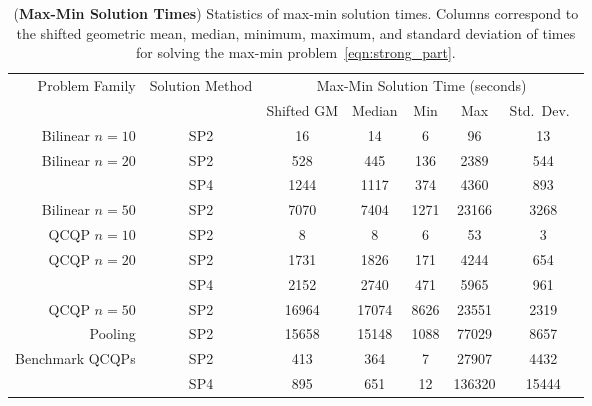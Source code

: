 \documentclass{article}
\begin{document}
\begin{table}
\centering
\begin{tabular}{ r | c | c c c c c }
\hline
Problem Family & Solution Method & \multicolumn{5}{c}{Max-Min Solution Time (seconds)} \\
& & Shifted GM & Median & Min & Max & Std.\ Dev.\ \\ \hline
Bilinear $n = 10$  &  SP2  &  16  &  14  &  6  &  96  &  13  \\[0.05in]
Bilinear $n = 20$ &  SP2  &  528  &  445  &  136  &  2389  &  544  \\
&  SP4  &  1244  &  1117  &  374  &  4360  &  893  \\[0.05in]
Bilinear $n = 50$  &  SP2  &  7070  &  7404  &  1271  &  23166  &  3268  \\[0.1in]
QCQP $n = 10$  &  SP2  &  8  &  8  &  6  &  53  &  3  \\[0.05in]
QCQP $n = 20$ &  SP2  &  1731  &  1826  &  171  &  4244  &  654  \\
&  SP4  &  2152  &  2740  &  471  &  5965  &  961  \\[0.05in]
QCQP $n = 50$  &  SP2  &  16964  &  17074  &  8626  &  23551  &  2319  \\[0.05in]
Pooling  &  SP2  &  15658  &  15148  &  1088  &  77029  &  8657  \\[0.05in]
Benchmark QCQPs  &  SP2  &  413  &  364  &  7  &  27907  &  4432  \\
&  SP4  &  895  &  651  &  12  &  136320  &  15444  \\ \hline
\end{tabular}
\caption{
(\textbf{Max-Min Solution Times}) Statistics of max-min solution times. 
Columns correspond to the shifted geometric mean, median, minimum, maximum, and standard deviation of times for solving the max-min problem~\eqref{eqn:strong_part}.
}
\label{tab:maxmin_times}
\end{table}
\end{document}
